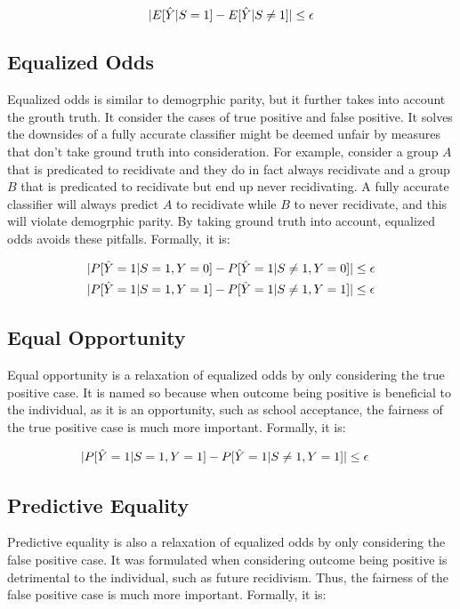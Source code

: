 \documentclass[conference]{IEEEtran}
\begin{document}
\[
    \lvert E[\hat{Y}|S = 1] - E[\hat{Y}|S \neq 1]\rvert \leq \epsilon
\]

\subsection{Equalized Odds}
Equalized odds is similar to demogrphic parity, but it further takes into account the grouth truth. It consider the cases of true positive and false positive. It solves the downsides of a fully accurate classifier might be deemed unfair by measures that don't take ground truth into consideration. For example, consider a group $A$ that is predicated to recidivate and they do in fact always recidivate and a group $B$ that is predicated to recidivate but end up never recidivating. A fully accurate classifier will always predict $A$ to recidivate while $B$ to never recidivate, and this will violate demogrphic parity. By taking ground truth into account, equalized odds avoids these pitfalls. Formally, it is:

\begin{align*}
    \lvert P[\hat{Y} = 1 | S = 1, Y = 0] - P[\hat{Y} = 1 | S \neq 1, Y = 0]\rvert & \leq \epsilon \\
    \lvert P[\hat{Y} = 1 | S = 1, Y = 1] - P[\hat{Y} = 1 | S \neq 1, Y = 1]\rvert & \leq \epsilon
\end{align*}

\subsection{Equal Opportunity}
Equal opportunity is a relaxation of equalized odds by only considering the true positive case. It is named so because when outcome being positive is beneficial to the individual, as it is an opportunity, such as school acceptance, the fairness of the true positive case is much more important. Formally, it is:

\begin{align*}
    \lvert P[\hat{Y} = 1 | S = 1, Y = 1] - P[\hat{Y} = 1 | S \neq 1, Y = 1]\rvert & \leq \epsilon
\end{align*}

\subsection{Predictive Equality}
Predictive equality is also a relaxation of equalized odds by only considering the false positive case. It was formulated \cite{corbett2017algorithmic} when considering outcome being positive is detrimental to the individual, such as future recidivism. Thus, the fairness of the false positive case is much more important. Formally, it is:
\end{document}
